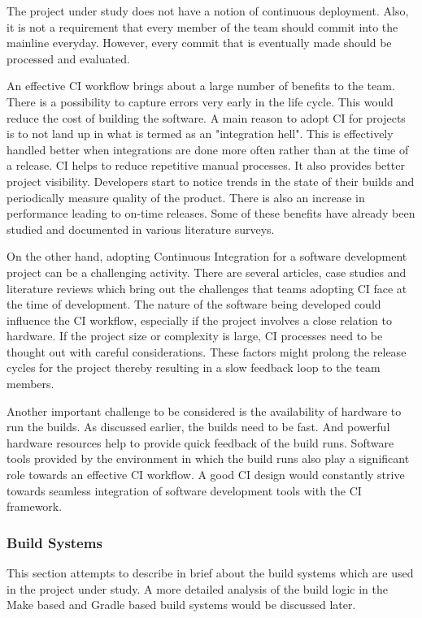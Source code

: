 \documentclass[12pt, a4paper, titlepage]{scrartcl}
\begin{document}
\par The project under study does not have a notion of continuous deployment. Also, it is not a requirement that every member of the team should commit into the mainline everyday. However, every commit that is eventually made should be processed and evaluated. 
\par An effective CI workflow brings about a large number of benefits to the team. There is a possibility to capture errors very early in the life cycle. This would reduce the cost of building the software. A main reason to adopt CI for projects is to not land up in what is termed as an "integration hell"\cite{duvall2007continuous}. This is effectively handled better when integrations are done more often rather than at the time of a release. CI helps to reduce repetitive manual processes. It also provides better project visibility. Developers start to notice trends in the state of their builds and periodically measure quality of the product. There is also an increase in performance leading to on-time releases. Some of these benefits have already been studied and documented in various literature surveys\cite{staahl2013experienced}\cite{miller2008hundred}.
\par On the other hand, adopting Continuous Integration for a software development project can be a challenging activity. There are several articles, case studies and literature reviews which bring out the challenges that teams adopting CI face at the time of development. The nature of the software being developed could influence the CI workflow, especially if the project involves a close relation to hardware\cite{debbiche2014challenges}. If the project size or complexity is large, CI processes need to be thought out with careful considerations. These factors might prolong the release cycles for the project thereby resulting in a slow feedback loop to the team members. 
\par Another important challenge to be considered is the availability of hardware to run the builds. As discussed earlier, the builds need to be fast. And powerful hardware resources help to provide quick feedback of the build runs\cite{claps2015journey}. Software tools provided by the environment in which the build runs also play a significant role towards an effective CI workflow\cite{olsson2012climbing}. A good CI design would constantly strive towards seamless integration of software development tools with the CI framework. 

\subsubsection{Build Systems}
\par This section attempts to describe in brief about the build systems which are used in the project under study. A more detailed analysis of the build logic in the Make based and Gradle based build systems would be discussed later. 
\end{document}
